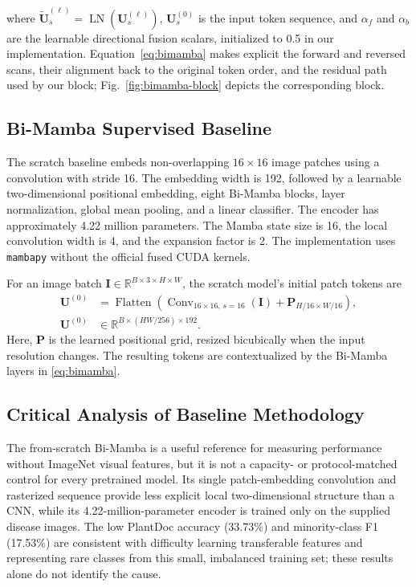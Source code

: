 \documentclass[conference]{IEEEtran}
\begin{document}
where $\widetilde{\mathbf{U}}_s^{(\ell)}=\operatorname{LN}(\mathbf{U}_s^{(\ell)})$, $\mathbf{U}_s^{(0)}$ is the input token sequence, and $\alpha_f$ and $\alpha_b$ are the learnable directional fusion scalars, initialized to 0.5 in our implementation. Equation~\eqref{eq:bimamba} makes explicit the forward and reversed scans, their alignment back to the original token order, and the residual path used by our block; Fig.~\ref{fig:bimamba-block} depicts the corresponding block.

\subsection{Bi-Mamba Supervised Baseline}
The scratch baseline embeds non-overlapping $16\times16$ image patches using a convolution with stride 16. The embedding width is 192, followed by a learnable two-dimensional positional embedding, eight Bi-Mamba blocks, layer normalization, global mean pooling, and a linear classifier. The encoder has approximately 4.22 million parameters. The Mamba state size is 16, the local convolution width is 4, and the expansion factor is 2. The implementation uses \texttt{mambapy} without the official fused CUDA kernels.

For an image batch $\mathbf{I}\in\mathbb{R}^{B\times3\times H\times W}$, the scratch model's initial patch tokens are
\begin{equation}
    \begin{aligned}
    \mathbf{U}^{(0)} &= \operatorname{Flatten}\!\left(\operatorname{Conv}_{16\times16,\,s=16}(\mathbf{I})+\mathbf{P}_{H/16\times W/16}\right),\\
    \mathbf{U}^{(0)} &\in\mathbb{R}^{B\times(HW/256)\times192}.
    \end{aligned}
    \label{eq:patch-tokens}
\end{equation}
Here, $\mathbf{P}$ is the learned positional grid, resized bicubically when the input resolution changes. The resulting tokens are contextualized by the Bi-Mamba layers in \eqref{eq:bimamba}.

\subsection{Critical Analysis of Baseline Methodology}
The from-scratch Bi-Mamba is a useful reference for measuring performance without ImageNet visual features, but it is not a capacity- or protocol-matched control for every pretrained model. Its single patch-embedding convolution and rasterized sequence provide less explicit local two-dimensional structure than a CNN, while its 4.22-million-parameter encoder is trained only on the supplied disease images. The low PlantDoc accuracy (33.73\%) and minority-class F1 (17.53\%) are consistent with difficulty learning transferable features and representing rare classes from this small, imbalanced training set; these results alone do not identify the cause.
\end{document}
